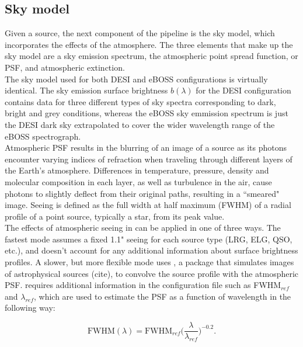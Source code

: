 \subsection{Sky model}
Given a source, the next component of the  pipeline is the sky model, which incorporates the effects of the atmosphere. The three elements that make up the sky model are a sky emission spectrum, the atmospheric point spread function, or PSF, and atmospheric extinction.\\


The sky model used for both DESI and eBOSS configurations is virtually identical. The sky emission surface brightness $b(\lambda)$ for the DESI configuration contains data for three different types of sky spectra corresponding to dark, bright and grey conditions, whereas the eBOSS sky emmission spectrum is just the DESI dark sky extrapolated to cover the wider wavelength range of the eBOSS spectrograph.\\

Atmospheric PSF results in the blurring of an image of a source as its photons encounter varying indices of refraction when traveling through different layers of the Earth's atmosphere. Differences in temperature, pressure, density and molecular composition in each layer, as well as turbulence in the air, cause photons to slightly deflect from their original paths, resulting in a ``smeared" image. Seeing is defined as the full width at half maximum (FWHM) of a radial profile of a point source, typically a star, from its peak value.\\

The effects of atmospheric seeing in  can be applied in one of three ways. The fastest mode assumes a fixed 1.1" seeing for each source type (LRG, ELG, QSO, etc.), and doesn't account for any additional information about surface brightness profiles. A slower, but more flexible mode uses , a package that simulates images of astrophysical sources (cite), to convolve the source profile with the atmospheric PSF.  requires additional information in the configuration file such as FWHM$_{ref}$ and $\lambda_{ref}$, which are used to estimate the PSF as a function of wavelength in the following way:

\begin{equation}
    \mbox{FWHM}(\lambda) = \mbox{FWHM}_{ref} \Big(\frac{\lambda}{\lambda_{ref}}\Big)^{-0.2}.
\end{equation}

